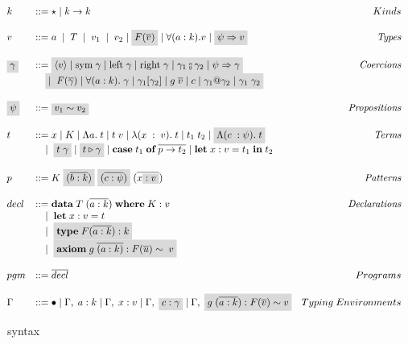\begin{figure}
\small
\[
\begin{array}{l l r}
    k &::= \star \mid k \rightarrow k &Kinds \\ \\
    v &::= a \;  \; | \;  \; T \;  \; | \;  \; v_1 \;  \; | \;  \; v_2  \; | \;
    \highlight{F(\overline{v})}  \; | \;  \forall (a : k). v  \; | \; \highlight{\psi
    \Rightarrow v} &\textit{Types}\\ \\
    \highlight{\gamma} &::= \highlight{\langle v \rangle \; | \; \text{sym} \; \gamma \; | \;
    \text{left} \; \gamma \; | \; \text{right} \; \gamma \; | \; \gamma_1
    \fctrans
    \gamma_2 \; | \; \psi \Rightarrow \gamma} &\textit{Coercions} \\
    \; &\quad \highlight{| \; \; F(\overline{\gamma}) \; | \; \forall (a : k) . \; \gamma \; | \;
    \gamma_1 [\gamma_2] \; | \; g \; \overline{v} \; | \; c \; | \; \gamma_1 @
    \gamma_2 \; | \; \gamma_1 \; \gamma_2} \\ \\
    \highlight{\psi} &::= \highlight{v_1 \sim v_2} &\textit{Propositions}\\ \\
    t &::= x \; | \; K \; | \; \Lambda a . \; t \; | \; t \; v \; | \;
    \lambda(x\; : \; v). \; t \; | \; t_1 \; t_2 \; | \; \highlight{\Lambda(c \; : \psi).
    \; t} &\textit{Terms} \\
          &\quad | \; \; \highlight{t \; \gamma} \; | \; \highlight{t \triangleright \gamma} \; | \;
    \textbf{case} \; t_1 \; \textbf{of} \; \overline{p \rightarrow t_2} \; | \;
    \textbf{let} \; x : v = t_1 \; \textbf{in} \; t_2 \\ \\
    p &::= K \; \highlight{(\overline{b : k})} \; \highlight{(\overline{c : \psi})} \;
    (\overline{x \highlight{: v}}) &\textit{Patterns}\\ \\
    decl &::= \textbf{data} \; T \; (\overline{a : k}) \; \textbf{where} \; K : v
         &\textit{Declarations}\\
         &\quad | \; \; \textbf{let} \; x : v = t \\
         &\quad | \; \; \highlight{\textbf{type} \; F(\overline{a : k}) : k} \\
         &\quad | \; \; \highlight{\textbf{axiom} \; g \; \overline{(a : k)} :
         F(\overline{u}) \sim \; v} \\ \\
    pgm &::= \overline{decl} &Programs \\ \\
    \Gamma &::= \bullet \mid \Gamma, \; a : k \mid \Gamma, \; x : v \mid \Gamma,
    \; \highlight{c : \gamma} \mid \Gamma, \; \highlight{g \; (\overline{a : k}) :
    F(\overline{v}) \sim v} &Typing \; Environments
\end{array}
\]
\caption{\systemfc~syntax}
\label{fc-syntax}
\end{figure}

